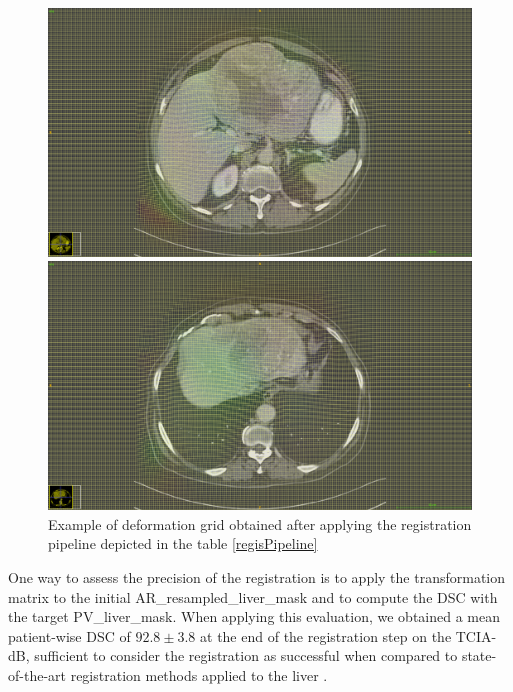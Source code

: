 \documentclass[]{article}
\newcommand{\lmttfont}[1]{{\fontfamily{lmtt}\selectfont #1}}
\begin{document}
\begin{figure}
\centering
\begin{minipage}{0.7\linewidth}
\includegraphics[width=\linewidth]{./images/TCIA_TCGA-DD-A11A_deformation_grid_slice49}
\end{minipage}

\vspace{0.8cm}
\begin{minipage}{0.7\linewidth}
\includegraphics[width=\linewidth]{./images/TCIA_TCGA-DD-A11A_deformation_grid_slice68}
\end{minipage}
\caption{Example of deformation grid obtained after applying the registration pipeline depicted in the table \ref{regisPipeline}}
\label{fig:deformationGridExamples}
\end{figure}

One way to assess the precision of the registration is to apply the
transformation matrix to the initial AR\_resampled\_liver\_mask and to
compute the DSC with the target PV\_liver\_mask. When applying this
evaluation, we obtained a mean patient-wise DSC of $ 92.8 \pm 3.8 $ at the
end of the registration step on the \lmttfont{TCIA-dB}, sufficient to consider the
registration as successful when compared to state-of-the-art
registration methods applied to the liver \cite{Zhao2019}.
\end{document}
